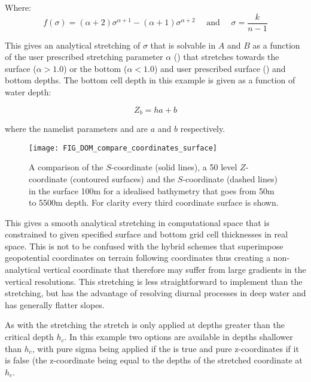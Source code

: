 \documentclass[../tex_main/NEMO_manual]{subfiles}
\begin{document}
Where:
\begin{equation} \label{eq:DOM_gamma}
f\left(\sigma\right)=\left(\alpha+2\right)\sigma^{\alpha+1}-\left(\alpha+1\right)\sigma^{\alpha+2} \quad \text{ and } \quad \sigma = \frac{k}{n-1} 
\end{equation}

This gives an analytical stretching of $\sigma$ that is solvable in $A$ and $B$ as a function of 
the user prescribed stretching parameter $\alpha$ () that stretches towards 
the surface ($\alpha > 1.0$) or the bottom ($\alpha < 1.0$) and user prescribed surface () 
and bottom depths. The bottom cell depth in this example is given as a function of water depth:

\begin{equation} \label{eq:DOM_zb}
Z_b= h a + b
\end{equation}

where the namelist parameters  and  are $a$ and $b$ respectively.

\begin{figure}[!ht]
   \texttt{[image: FIG\_DOM\_compare\_coordinates\_surface]}
        \caption{A comparison of the \citet{Song_Haidvogel_JCP94} $S$-coordinate (solid lines), a 50 level $Z$-coordinate (contoured surfaces) and the \citet{Siddorn_Furner_OM12} $S$-coordinate (dashed lines) in the surface 100m for a idealised bathymetry that goes from 50m to 5500m depth. For clarity every third coordinate surface is shown.}
    \label{fig:fig_compare_coordinates_surface}
\end{figure}

This gives a smooth analytical stretching in computational space that is constrained to given specified surface and bottom grid cell thicknesses in real space. This is not to be confused with the hybrid schemes that superimpose geopotential coordinates on terrain following coordinates thus creating a non-analytical vertical coordinate that therefore may suffer from large gradients in the vertical resolutions. This stretching is less straightforward to implement than the \citet{Song_Haidvogel_JCP94} stretching, but has the advantage of resolving diurnal processes in deep water and has generally flatter slopes.

As with the \citet{Song_Haidvogel_JCP94} stretching the stretch is only applied at depths greater than the critical depth $h_c$. In this example two options are available in depths shallower than $h_c$, with pure sigma being applied if the  is true and pure z-coordinates if it is false (the z-coordinate being equal to the depths of the stretched coordinate at $h_c$.
\end{document}
